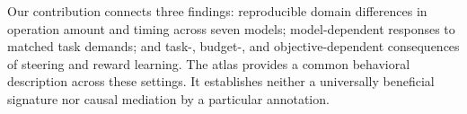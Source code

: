 Our contribution connects three findings: reproducible domain differences in operation amount and timing across seven models; model-dependent responses to matched task demands; and task-, budget-, and objective-dependent consequences of steering and reward learning. The atlas provides a common behavioral description across these settings. It establishes neither a universally beneficial signature nor causal mediation by a particular annotation.
